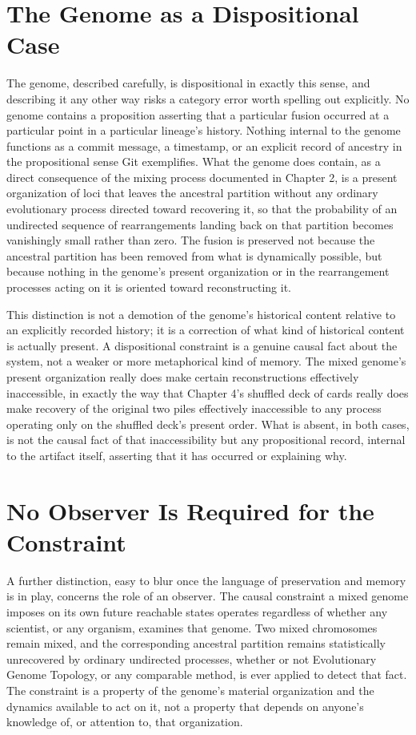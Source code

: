 \documentclass[11pt]{book}
\begin{document}
\section{The Genome as a Dispositional Case}

The genome, described carefully, is dispositional in exactly this sense, and describing it any other way risks a category error worth spelling out explicitly. No genome contains a proposition asserting that a particular fusion occurred at a particular point in a particular lineage's history. Nothing internal to the genome functions as a commit message, a timestamp, or an explicit record of ancestry in the propositional sense Git exemplifies. What the genome does contain, as a direct consequence of the mixing process documented in Chapter 2, is a present organization of loci that leaves the ancestral partition without any ordinary evolutionary process directed toward recovering it, so that the probability of an undirected sequence of rearrangements landing back on that partition becomes vanishingly small rather than zero. The fusion is preserved not because the ancestral partition has been removed from what is dynamically possible, but because nothing in the genome's present organization or in the rearrangement processes acting on it is oriented toward reconstructing it.

This distinction is not a demotion of the genome's historical content relative to an explicitly recorded history; it is a correction of what kind of historical content is actually present. A dispositional constraint is a genuine causal fact about the system, not a weaker or more metaphorical kind of memory. The mixed genome's present organization really does make certain reconstructions effectively inaccessible, in exactly the way that Chapter 4's shuffled deck of cards really does make recovery of the original two piles effectively inaccessible to any process operating only on the shuffled deck's present order. What is absent, in both cases, is not the causal fact of that inaccessibility but any propositional record, internal to the artifact itself, asserting that it has occurred or explaining why.

\section{No Observer Is Required for the Constraint}

A further distinction, easy to blur once the language of preservation and memory is in play, concerns the role of an observer. The causal constraint a mixed genome imposes on its own future reachable states operates regardless of whether any scientist, or any organism, examines that genome. Two mixed chromosomes remain mixed, and the corresponding ancestral partition remains statistically unrecovered by ordinary undirected processes, whether or not Evolutionary Genome Topology, or any comparable method, is ever applied to detect that fact. The constraint is a property of the genome's material organization and the dynamics available to act on it, not a property that depends on anyone's knowledge of, or attention to, that organization.
\end{document}
